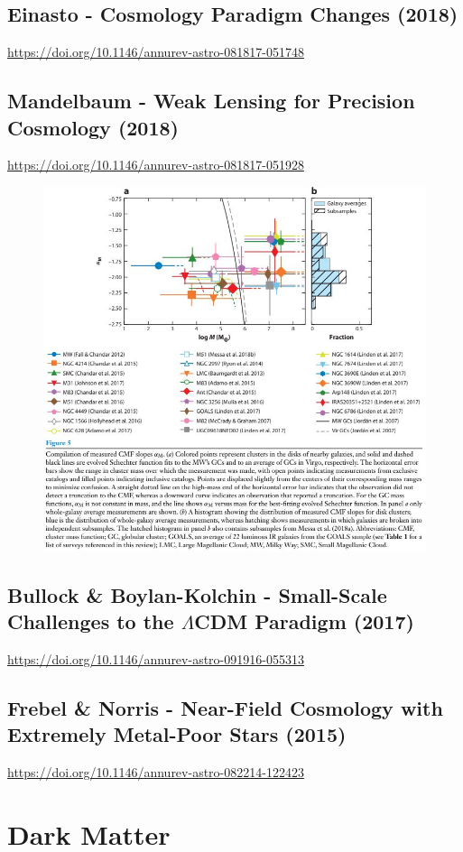 \subsection*{Einasto - Cosmology Paradigm Changes (2018)}
\url{https://doi.org/10.1146/annurev-astro-081817-051748}


\subsection*{Mandelbaum - Weak Lensing for Precision Cosmology (2018)}
\url{https://doi.org/10.1146/annurev-astro-081817-051928}
\begin{figure}[H]
    \centering
    \includegraphics[width=.85 \textwidth]{Pictures/99/ei2018-4.jpg}
\end{figure}

\subsection*{Bullock \& Boylan-Kolchin - Small-Scale Challenges to the $\Lambda$CDM Paradigm (2017)}
\url{https://doi.org/10.1146/annurev-astro-091916-055313}

\subsection*{Frebel \& Norris - Near-Field Cosmology with Extremely Metal-Poor Stars (2015)}
\url{https://doi.org/10.1146/annurev-astro-082214-122423}


\section{Dark Matter}

